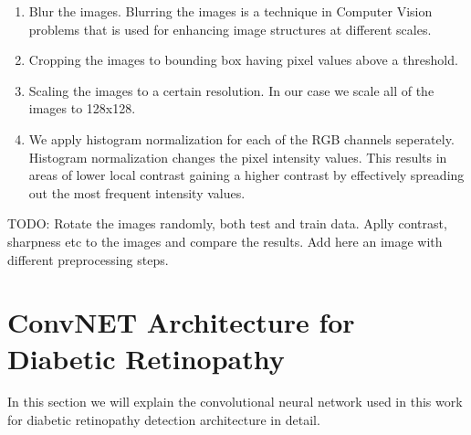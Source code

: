\begin{enumerate}
    \item Blur the images. Blurring the images is a technique in Computer Vision problems that is used for enhancing image structures at different scales.
    \item Cropping the images to bounding box having pixel values above a threshold.
    \item Scaling the images to a certain resolution. In our case we scale all of the images to 128x128.
    \item We apply histogram normalization for each of the RGB channels seperately. Histogram normalization changes the pixel intensity values. This results in areas of lower local contrast gaining a higher contrast by effectively spreading out the most frequent intensity values.
\end{enumerate}

TODO: Rotate the images randomly, both test and train data. 
Aplly contrast, sharpness etc to the images and compare the results. 
Add here an image with different preprocessing steps. 

\section{ConvNET Architecture for Diabetic Retinopathy}
In this section we will explain the convolutional neural network used in this work for diabetic retinopathy detection architecture in detail. 

